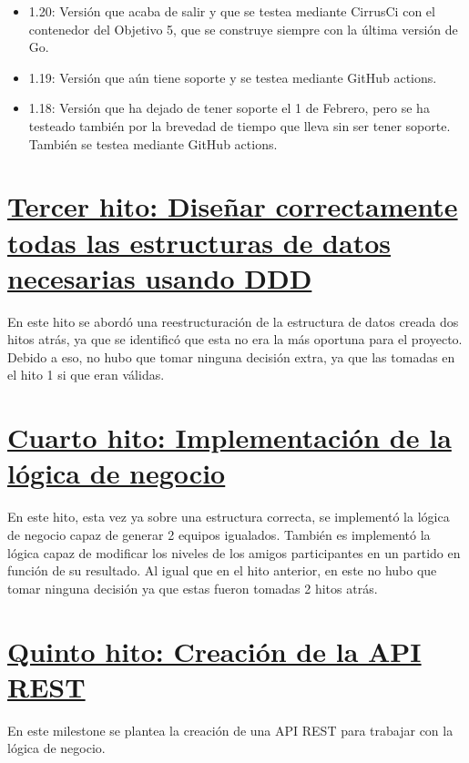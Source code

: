 \begin{itemize}
\item
  1.20: Versión que acaba de salir y que se testea mediante CirrusCi con
  el contenedor del Objetivo 5, que se construye siempre con la última
  versión de Go.
\item
  1.19: Versión que aún tiene soporte y se testea mediante GitHub
  actions.
\item
  1.18: Versión que ha dejado de tener soporte el 1 de Febrero, pero se
  ha testeado también por la brevedad de tiempo que lleva sin ser tener
  soporte. También se testea mediante GitHub actions.
\end{itemize}

\section{\href{https://github.com/manujurado1/SportsBar-IV/tree/PMV-Estructuras_de_datos}{Tercer hito:  Diseñar correctamente todas las estructuras de datos necesarias usando DDD}} 

En este hito se abordó una reestructuración de la estructura de datos creada dos hitos atrás, ya que se identificó que esta no era 
la más oportuna para el proyecto. Debido a eso, no hubo que tomar ninguna decisión extra, ya que las tomadas en el hito 1 si que eran válidas.

\section{\href{https://github.com/manujurado1/SportsBar-IV/tree/PMV-Logica_de_negocio}{Cuarto hito: Implementación de la lógica de negocio}}

En este hito, esta vez ya sobre una estructura correcta, se implementó la lógica de negocio capaz de generar 2 equipos igualados.
También es implementó la lógica capaz de modificar los niveles de los amigos participantes en un partido en función de su resultado.
Al igual que en el hito anterior, en este no hubo que tomar ninguna decisión ya que estas fueron tomadas 2 hitos atrás.

\newpage
\section{\href{https://github.com/manujurado1/SportsBar-IV/tree/PMV-Creacion_API}{Quinto hito: Creación de la API REST}}

En este milestone se plantea la creación de una API REST para trabajar con la lógica de negocio.

